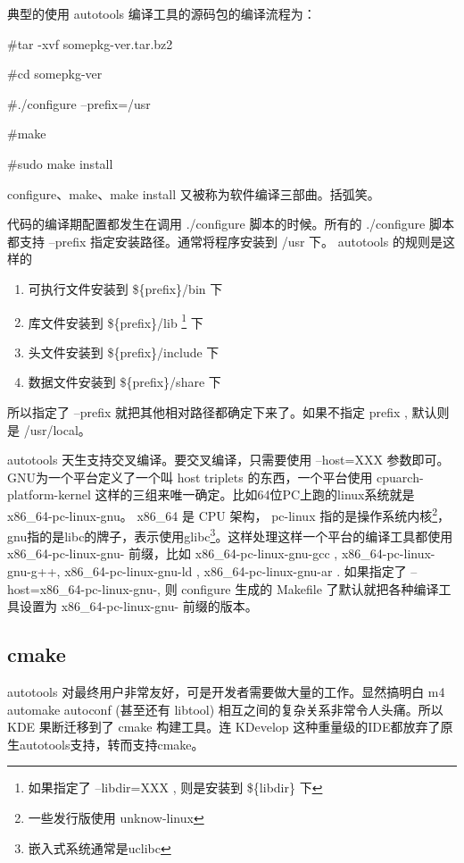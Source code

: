 典型的使用 autotools 编译工具的源码包的编译流程为：

\begin{code}
\#tar -xvf somepkg-ver.tar.bz2

\#cd somepkg-ver

\#./configure --prefix=/usr %

\#make

\#sudo make install
\end{code}

configure、make、make install 又被称为软件编译三部曲。括弧笑。

代码的编译期配置都发生在调用 ./configure 脚本的时候。所有的 ./configure 脚本都支持 --prefix 指定安装路径。通常将程序安装到 /usr 下。
autotools 的规则是这样的

\begin{enumerate}
\item 可执行文件安装到 \$\{prefix\}/bin 下
\item 库文件安装到 \$\{prefix\}/lib \footnote{如果指定了 --libdir=XXX , 则是安装到 \$\{libdir\} 下 } 下
\item 头文件安装到 \$\{prefix\}/include 下
\item 数据文件安装到 \$\{prefix\}/share 下
\end{enumerate}

所以指定了 --prefix 就把其他相对路径都确定下来了。如果不指定 prefix , 默认则是 /usr/local。

autotools 天生支持交叉编译。要交叉编译，只需要使用 --host=XXX 参数即可。
GNU为一个平台定义了一个叫 host triplets 的东西，一个平台使用 cpuarch-platform-kernel 这样的三组来唯一确定。比如64位PC上跑的linux系统就是 x86\_64-pc-linux-gnu。 x86\_64 是 CPU 架构， pc-linux 指的是操作系统内核\footnote{一些发行版使用 unknow-linux}，gnu指的是libc的牌子，表示使用glibc\footnote{嵌入式系统通常是uclibc}。这样处理这样一个平台的编译工具都使用 x86\_64-pc-linux-gnu- 前缀，比如 x86\_64-pc-linux-gnu-gcc , x86\_64-pc-linux-gnu-g++,  x86\_64-pc-linux-gnu-ld , x86\_64-pc-linux-gnu-ar . 如果指定了 --host=x86\_64-pc-linux-gnu-,  则 configure 生成的 Makefile 了默认就把各种编译工具设置为 x86\_64-pc-linux-gnu- 前缀的版本。


\subsection{cmake}

autotools 对最终用户非常友好，可是开发者需要做大量的工作。显然搞明白 m4 automake autoconf (甚至还有 libtool) 相互之间的复杂关系非常令人头痛。所以 KDE 果断迁移到了 cmake 构建工具。连 KDevelop 这种重量级的IDE都放弃了原生autotools支持，转而支持cmake。

